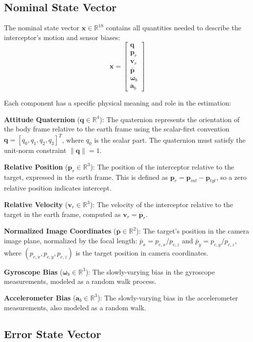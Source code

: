 \documentclass[11pt,a4paper]{article}
\newcommand{\quat}{\mathbf{q}}
\newcommand{\pr}{\mathbf{p}_r}
\newcommand{\vr}{\mathbf{v}_r}
\newcommand{\pbar}{\bar{\mathbf{p}}}
\newcommand{\bgyr}{\bm{\omega}_b}
\newcommand{\bacc}{\mathbf{a}_b}
\begin{document}
\subsection{Nominal State Vector}

The nominal state vector $\mathbf{x} \in \mathbb{R}^{18}$ contains all quantities needed to describe the interceptor's motion and sensor biases:
\begin{equation}
    \mathbf{x} = \begin{bmatrix} \quat \\ \pr \\ \vr \\ \pbar \\ \bgyr \\ \bacc \end{bmatrix}
\end{equation}

Each component has a specific physical meaning and role in the estimation:

\textbf{Attitude Quaternion} ($\quat \in \mathbb{R}^4$): The quaternion represents the orientation of the body frame relative to the earth frame using the scalar-first convention $\quat = [q_0, q_1, q_2, q_3]^T$, where $q_0$ is the scalar part. The quaternion must satisfy the unit-norm constraint $\|\quat\| = 1$.

\textbf{Relative Position} ($\pr \in \mathbb{R}^3$): The position of the interceptor relative to the target, expressed in the earth frame. This is defined as $\pr = \mathbf{p}_{int} - \mathbf{p}_{tgt}$, so a zero relative position indicates intercept.

\textbf{Relative Velocity} ($\vr \in \mathbb{R}^3$): The velocity of the interceptor relative to the target in the earth frame, computed as $\vr = \dot{\pr}$.

\textbf{Normalized Image Coordinates} ($\pbar \in \mathbb{R}^2$): The target's position in the camera image plane, normalized by the focal length: $\bar{p}_x = p_{c,x}/p_{c,z}$ and $\bar{p}_y = p_{c,y}/p_{c,z}$, where $(p_{c,x}, p_{c,y}, p_{c,z})$ is the target position in camera coordinates.

\textbf{Gyroscope Bias} ($\bgyr \in \mathbb{R}^3$): The slowly-varying bias in the gyroscope measurements, modeled as a random walk process.

\textbf{Accelerometer Bias} ($\bacc \in \mathbb{R}^3$): The slowly-varying bias in the accelerometer measurements, also modeled as a random walk.

\subsection{Error State Vector}
\end{document}
